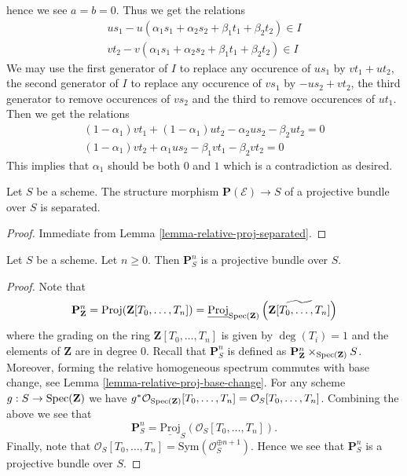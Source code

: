 \begin{example}
hence we see $a = b = 0$. Thus we get the relations
$$
\begin{matrix}
us_1 - u(\alpha_1s_1 + \alpha_2s_2 + \beta_1t_1 + \beta_2t_2)
\in I \\
vt_2 - v(\alpha_1s_1 + \alpha_2s_2 + \beta_1t_1 + \beta_2t_2)
\in I
\end{matrix}
$$
We may use the first generator of $I$ to replace any occurence of
$us_1$ by $vt_1 + ut_2$, the second generator of $I$ to replace any
occurence of $vs_1$ by $-us_2 + vt_2$, the third generator
to remove occurences of $vs_2$ and the third to remove occurences
of $ut_1$. Then we get the relations
$$
\begin{matrix}
(1 - \alpha_1)vt_1 + (1 - \alpha_1)ut_2 - \alpha_2us_2 - \beta_2ut_2 = 0 \\
(1 - \alpha_1)vt_2 + \alpha_1us_2 - \beta_1vt_1 - \beta_2vt_2 = 0
\end{matrix}
$$
This implies that $\alpha_1$ should be both $0$ and $1$ which is
a contradiction as desired.
\end{example}


\begin{lemma}
\label{lemma-projective-bundle-separated}
Let $S$ be a scheme.
The structure morphism $\mathbf{P}(\mathcal{E}) \to S$ of a 
projective bundle over $S$ is separated.
\end{lemma}

\begin{proof}
Immediate from Lemma \ref{lemma-relative-proj-separated}.
\end{proof}

\begin{lemma}
\label{lemma-projective-space-bundle}
Let $S$ be a scheme. Let $n \geq 0$. Then
$\mathbf{P}^n_S$ is a projective bundle over $S$.
\end{lemma}

\begin{proof}
Note that
$$
\mathbf{P}^n_{\mathbf{Z}} =
\text{Proj}(\mathbf{Z}[T_0, \ldots, T_n]) =
\underline{\text{Proj}}_{\mathop{\rm Spec}(\mathbf{Z})}
\left(\widetilde{\mathbf{Z}[T_0, \ldots, T_n]}\right)
$$
where the grading on the ring $\mathbf{Z}[T_0, \ldots, T_n]$ is given by
$\deg(T_i) = 1$ and the elements of $\mathbf{Z}$ are in degree $0$.
Recall that $\mathbf{P}^n_S$ is defined as
$\mathbf{P}^n_{\mathbf{Z}} \times_{\mathop{\rm Spec}(\mathbf{Z})} S$.
Moreover, forming the relative homogeneous spectrum commutes with base change,
see Lemma \ref{lemma-relative-proj-base-change}.
For any scheme $g : S \to \mathop{\rm Spec}(\mathbf{Z})$ we have
$g^*\mathcal{O}_{\mathop{\rm Spec}(\mathbf{Z})}[T_0, \ldots, T_n]
= \mathcal{O}_S[T_0, \ldots, T_n]$.
Combining the above we see that
$$
\mathbf{P}^n_S = \underline{\text{Proj}}_S(\mathcal{O}_S[T_0, \ldots, T_n]).
$$
Finally, note that
$\mathcal{O}_S[T_0, \ldots, T_n] = \text{Sym}(\mathcal{O}_S^{\oplus n + 1})$.
Hence we see that $\mathbf{P}^n_S$ is a projective bundle over $S$.
\end{proof}







